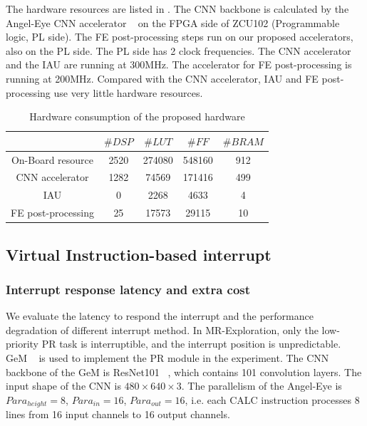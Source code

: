 The hardware resources are listed in . The CNN backbone is calculated by the Angel-Eye CNN accelerator ~\cite{guo2017angel} on the FPGA side of ZCU102 (Programmable logic, PL side). The FE post-processing steps run on our proposed accelerators, also on the PL side. The PL side has 2 clock frequencies. The CNN accelerator and the IAU are running at 300MHz. The accelerator for FE post-processing is running at 200MHz. Compared with the CNN accelerator, IAU and FE post-processing use very little hardware resources.

\begin{table}[t]
  \centering
  \setlength{\abovecaptionskip}{2pt}
  \caption{Hardware consumption of the proposed hardware}
\begin{tabular}{|c|c|c|c|c|}
  \hline
        & $\# DSP$ & $\# LUT$ & $\# FF$ & $\# BRAM$ \\
  \hline
  On-Board resource &   2520   &  274080      &  548160     & 912 \\
  \hline
  CNN accelerator &   1282   &  74569      &   171416    & 499 \\
  \hline
  IAU &   0   &  2268      &   4633    & 4 \\
  \hline
  FE post-processing & 25      &  17573     &   29115    & 10 \\
  \hline
  \end{tabular}%
  
  \label{tab:hardware}%
\end{table}%


\subsection{Virtual Instruction-based interrupt }

\subsubsection{ Interrupt response latency and extra cost}


We evaluate the latency to respond the interrupt and the performance degradation of different interrupt method. In MR-Exploration, only the low-priority PR task is interruptible, and the interrupt position is unpredictable. GeM  ~\cite{radenovic2018fine} is used to implement the PR module in the experiment.
The CNN backbone of the GeM is ResNet101  ~\cite{he2016deep}, which contains 101 convolution layers. The input shape of the CNN is $480 \times 640 \times 3$. The parallelism of the Angel-Eye is $Para_{height}=8$, $Para_{in}=16$, $Para_{out}=16$, i.e. each CALC instruction processes 8 lines from 16 input channels to 16 output channels. 

